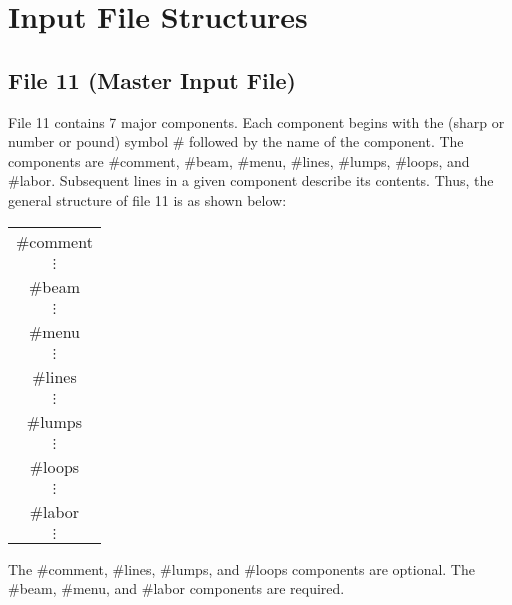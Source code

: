 \section{Input File Structures}
\subsection{File 11 (Master Input File)} 
     File 11 contains 7 major components.  Each component begins with the
(sharp or number or pound) symbol \# followed by the name of the component.  The
components are \#comment, \#beam, \#menu, \#lines, \#lumps, \#loops, and \#labor.
Subsequent lines in a given component describe its contents.  Thus, the
general structure of file 11 is as shown below:
\begin{center}
\begin{tabular}{c}
        \#comment \\
       $\vdots$    \\
        \#beam    \\
       $\vdots$    \\
        \#menu    \\
       $\vdots$    \\
        \#lines   \\
       $\vdots$    \\
        \#lumps   \\
       $\vdots$    \\
        \#loops   \\
       $\vdots$    \\
        \#labor   \\
       $\vdots$
\end{tabular}
\end{center}
The \#comment, \#lines, \#lumps, and \#loops components are optional.  The
\#beam, \#menu, and \#labor components are required.

